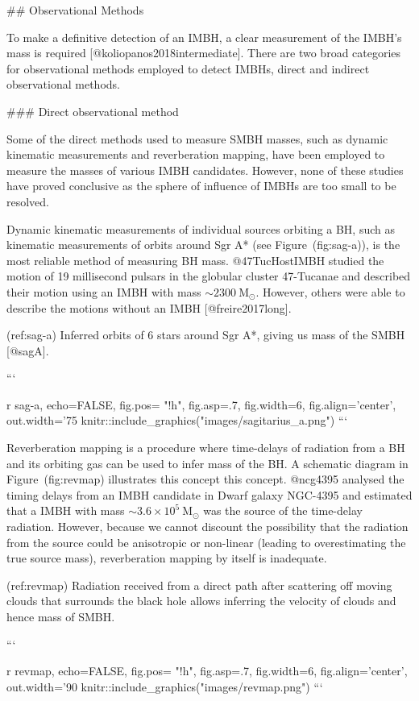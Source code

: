 {{{{{{{{{{{{{{## Observational Methods

To make a definitive detection of an IMBH, a clear measurement of the
IMBH's mass is required [@koliopanos2018intermediate].  There
are two broad categories for observational methods employed to detect
IMBHs, direct and indirect observational methods.

### Direct observational method

Some of the direct methods used to measure SMBH masses, such as dynamic
kinematic measurements and reverberation mapping, have been employed
to measure the masses of various IMBH candidates. However, none of these
studies have proved conclusive as the sphere of influence of IMBHs are
too small to be resolved.

Dynamic kinematic measurements of individual sources orbiting a BH, such
as kinematic measurements of orbits around Sgr A* (see
Figure~\@ref(fig:sag-a)), is the most reliable method of measuring BH
mass. @47TucHostIMBH studied the motion of 19 millisecond pulsars in the
globular cluster 47-Tucanae and described their motion using an IMBH
with mass ${\sim2300\ \text{M}_{\odot}}$. However, others were able to
describe the motions without an IMBH [@freire2017long].

(ref:sag-a) Inferred orbits of 6 stars around Sgr A*, giving us mass of the SMBH [@sagA].

```{r sag-a, echo=FALSE, fig.pos= "!h", fig.asp=.7, fig.width=6, fig.align='center', out.width='75%
knitr::include_graphics("images/sagitarius_a.png")
```

Reverberation mapping is a procedure where time-delays of radiation from
a BH and its orbiting gas can be used to infer mass of the BH. A
schematic diagram in Figure~\@ref(fig:revmap) illustrates this concept
this concept. @ncg4395 analysed the timing delays from an IMBH candidate
in Dwarf galaxy NGC-4395 and estimated that a IMBH with mass
${\sim3.6\times10^5\ \text{M}_{\odot}}$ was the source of the time-delay
radiation. However, because we cannot discount the possibility that the
radiation from the source could be anisotropic or non-linear (leading to
overestimating the true source mass), reverberation mapping by
itself is inadequate.


(ref:revmap) Radiation received from a direct path after scattering off moving clouds that surrounds the black hole allows inferring the velocity of clouds and hence mass of SMBH.

```{r revmap, echo=FALSE, fig.pos= "!h", fig.asp=.7, fig.width=6, fig.align='center', out.width='90%
knitr::include_graphics("images/revmap.png")
```

}}}}}}}}}}}}}}}}
